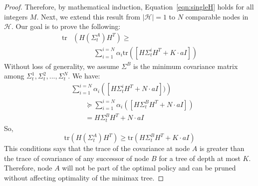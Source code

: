 \documentclass[journal]{IEEEtran}
\begin{document}
\begin{proof}
Therefore, by mathematical induction, Equation~\ref{eqn:singleH} holds for all integers $M$. Next, we extend this result from $|\mathcal{H}| = 1$ to $ N$ comparable nodes in $\mathcal{H}$. Our goal is to prove the following:
\begin{equation}
\begin{aligned}
\text{tr}&\left(  H\left( \Sigma^A_{t}\right) H^T \right) \ge \\  &\qquad \quad \sum^{i=N}_{i=1}\alpha_i\text{tr}\left( \left[H\Sigma^i_{t}H^T+K\cdot aI\right] \right)
\end{aligned}
\label{eqn:multiH}
\end{equation}
Without loss of generality, we assume $\Sigma^B$ is the minimum covariance matrix among  $\Sigma^1_{t},\Sigma^2_{t},...,\Sigma^N_{t}$. We have:
\begin{equation}
\begin{split}
&\sum^{i=N}_{i=1} \alpha_i \left(\left[H\Sigma^i_{t}H^T+N\cdot aI\right])\right)\\
&\qquad\succeq \sum^{i=N}_{i=1} \alpha_i \left(\left[H\Sigma^B_{t}H^T+N\cdot aI\right]\right)\\
&\qquad = H\Sigma^B_{t}H^T+N
\cdot aI
\end{split}
\end{equation}
So, 
\begin{equation}
\text{tr}\left(  H\left( \Sigma^A_{t}\right) H^T \right) \ge   \text{tr}\left(H\Sigma^B_{t}H^T+K\cdot aI\right)
\end{equation}
This conditions says that the trace of the covariance at node $A$ is greater than the trace of covariance of any successor of node $B$ for a tree of depth at most $K$. Therefore, node $A$ will not be part of the optimal policy and can be pruned without affecting optimality of the minimax tree.
\end{proof}
\end{document}
